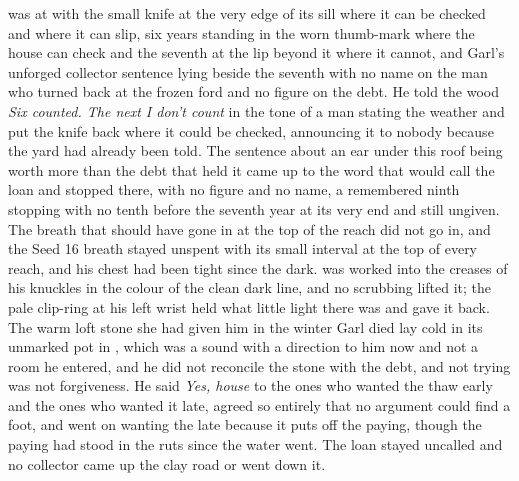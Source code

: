  was at  with the small knife at the very edge of its sill where it can be checked and where it can slip, six years standing in the worn thumb-mark where the house can check and the seventh at the lip beyond it where it cannot, and Garl's unforged collector sentence lying beside the seventh with no name on the man who turned back at the frozen ford and no figure on the debt. He told the wood \emph{Six counted. The next I don't count} in the tone of a man stating the weather and put the knife back where it could be checked, announcing it to nobody because the yard had already been told. The sentence about an ear under this roof being worth more than the debt that held it came up to the word that would call the loan and stopped there, with no figure and no name, a remembered ninth stopping with no tenth before the seventh year at its very end and still ungiven. The breath that should have gone in at the top of the reach did not go in, and the Seed 16 breath stayed unspent with its small interval at the top of every reach, and his chest had been tight since the dark.  was worked into the creases of his knuckles in the colour of the clean dark line, and no scrubbing lifted it; the pale clip-ring at his left wrist held what little light there was and gave it back. The warm loft stone she had given him in the winter Garl died lay cold in its unmarked pot in , which was a sound with a direction to him now and not a room he entered, and he did not reconcile the stone with the debt, and not trying was not forgiveness. He said \emph{Yes, house} to the ones who wanted the thaw early and the ones who wanted it late, agreed so entirely that no argument could find a foot, and went on wanting the late because it puts off the paying, though the paying had stood in the ruts since the water went. The loan stayed uncalled and no collector came up the clay road or went down it.

